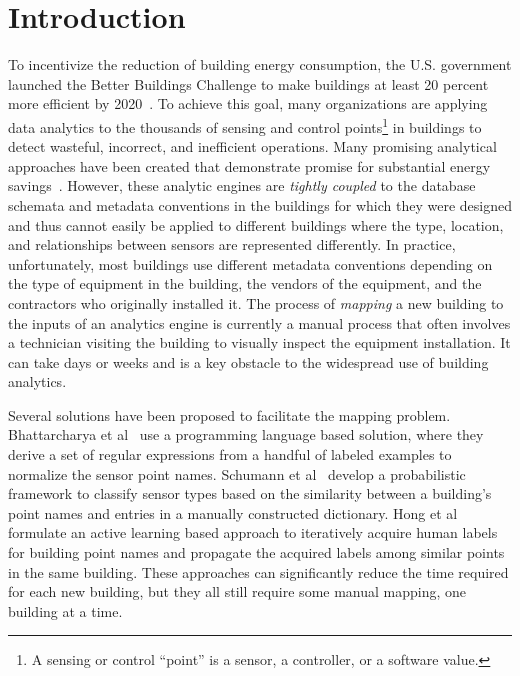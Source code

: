 \section{Introduction}

To incentivize the reduction of building energy consumption, the U.S. government
launched the Better Buildings Challenge to make buildings at least 20 percent
more efficient by 2020~\cite{doe2013better}. To achieve this goal, many
organizations are applying data analytics to the thousands of sensing and
control points\footnote{A sensing or control ``point'' is a sensor, a
  controller, or a software value.} in buildings to detect wasteful, incorrect,
and inefficient operations. Many promising analytical approaches have been
created that demonstrate promise for substantial energy savings~\cite{mpc, comfy}.
However, these analytic engines are \emph{tightly coupled} to the database schemata and metadata conventions in the buildings for which they were designed
and thus cannot easily be applied to different buildings where the type, location,
and relationships between sensors are represented differently. In practice, unfortunately, most
buildings use different metadata conventions depending on the type of equipment
in the building, the vendors of the equipment, and the contractors who
originally installed it. The process of {\em mapping} a new building to the
inputs of an analytics engine is currently a manual process that often involves
a technician visiting the building to visually inspect the equipment
installation. It can take days or weeks and is a key obstacle to the widespread
use of building analytics.

Several solutions have been proposed to facilitate the mapping problem.
Bhattarcharya et al~\cite{arka} use a programming language based solution,
where they derive a set of regular expressions from a handful of labeled examples
to normalize the sensor point names.
Schumann et al~\cite{ibm} develop a probabilistic framework to classify sensor types
based on the similarity between a building's point names and entries in a manually constructed dictionary.
Hong et al~\cite{cikm} formulate an active learning based approach to
iteratively acquire human labels for building point names and propagate the
acquired labels among similar points in the same building.  These approaches can
significantly reduce the time required for each new building, but they all still
require some manual mapping, one building at a time.

